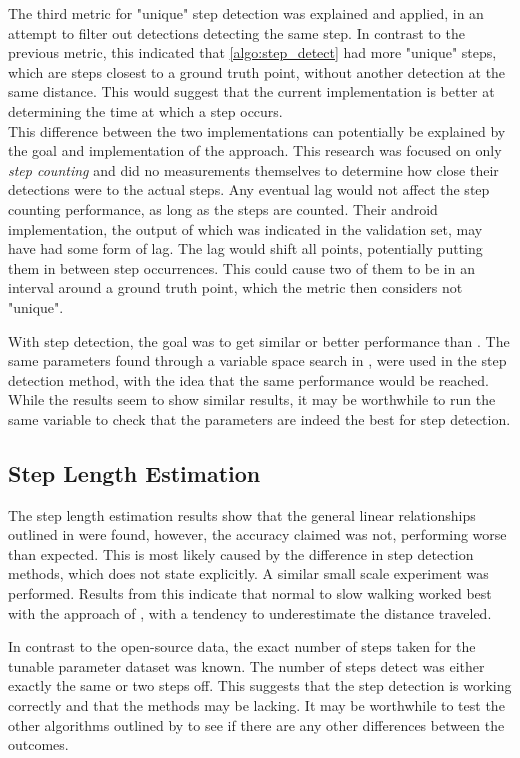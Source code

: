 The third metric for "unique" step detection was explained and applied, in an attempt to filter out detections detecting the same step. In contrast to the previous metric, this indicated that \cref{algo:step_detect} had more "unique" steps, which are steps closest to a ground truth point, without another detection at the same distance. This would suggest that the current implementation is better at determining the time at which a step occurs. \\
This difference between the two implementations can potentially be explained by the goal and implementation of the \citet{Salvi2018} approach. This research was focused on only \textit{step counting} and did no measurements themselves to determine how close their detections were to the actual steps. Any eventual lag would not affect the step counting performance, as long as the steps are counted. Their android implementation, the output of which was indicated in the validation set, may have had some form of lag. The lag would shift all points, potentially putting them in between step occurrences. This could cause two of them to be in an interval around a ground truth point, which the metric then considers not "unique". \par 

With step detection, the goal was to get similar or better performance than \cite{Salvi2018} . The same parameters found through a variable space search in \cite{Salvi2018}, were used in the step detection method, with the idea that the same performance would be reached. While the results seem to show similar results, it may be worthwhile to run the same variable to check that the parameters are indeed the best for step detection.

\subsection*{Step Length Estimation}
The step length estimation results show that the general linear relationships outlined in \cite{Vezocnik2019} were found, however, the accuracy claimed was not, performing worse than expected. This is most likely caused by the difference in step detection methods, which \cite{Vezocnik2019} does not state explicitly. A similar small scale experiment was performed. Results from this indicate that normal to slow walking worked best with the approach of \cite{Tian2016}, with a tendency to underestimate the distance traveled. \par 

In contrast to the open-source data, the exact number of steps taken for the tunable parameter dataset was known. The number of steps detect was either exactly the same or two steps off. This suggests that the step detection is working correctly and that the methods may be lacking. It may be worthwhile to test the other algorithms outlined by \cite{Vezocnik2019} to see if there are any other differences between the outcomes. 

